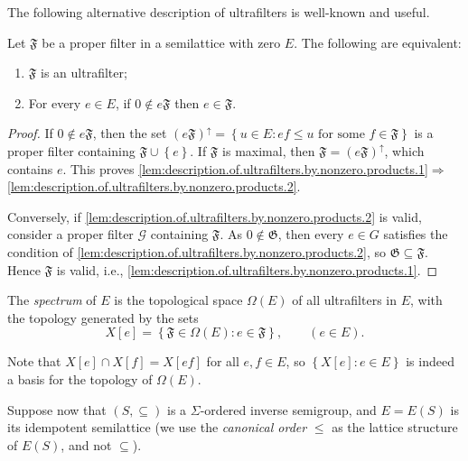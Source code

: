 The following alternative description of ultrafilters is well-known and useful.

\begin{lemma}\label{lem:description.of.ultrafilters.by.nonzero.products}
    Let $\mathfrak{F}$ be a proper filter in a semilattice with zero $E$. The following are equivalent:
    \begin{enumerate}[label=(\arabic*)]
        \item\label{lem:description.of.ultrafilters.by.nonzero.products.1} $\mathfrak{F}$ is an ultrafilter;
        \item\label{lem:description.of.ultrafilters.by.nonzero.products.2} For every $e\in E$, if $0\not\in e\mathfrak{F}$ then $e\in\mathfrak{F}$.
    \end{enumerate}
\end{lemma}
\begin{proof}
    If $0\not\in e\mathfrak{F}$, then the set $(e\mathfrak{F})^{\uparrow}=\left\{u\in E:ef\leq u\text{ for some }f\in\mathfrak{F}\right\}$ is a proper filter containing $\mathfrak{F}\cup\left\{e\right\}$. If $\mathfrak{F}$ is maximal, then $\mathfrak{F}=(e\mathfrak{F})^{\uparrow}$, which contains $e$. This proves \ref{lem:description.of.ultrafilters.by.nonzero.products.1}$\Rightarrow$\ref{lem:description.of.ultrafilters.by.nonzero.products.2}. 
    
    Conversely, if \ref{lem:description.of.ultrafilters.by.nonzero.products.2} is valid, consider a proper filter $\mathcal{G}$ containing $\mathfrak{F}$. As $0\not\in\mathfrak{G}$, then every $e\in G$ satisfies the condition of \ref{lem:description.of.ultrafilters.by.nonzero.products.2}, so $\mathfrak{G}\subseteq\mathfrak{F}$. Hence $\mathfrak{F}$ is valid, i.e., \ref{lem:description.of.ultrafilters.by.nonzero.products.1}.\qedhere
\end{proof}

\begin{definition}
    The \emph{spectrum} of $E$ is the topological space $\Omega(E)$ of all ultrafilters in $E$, with the topology generated by the sets
    \[X[e]=\left\{\mathfrak{F}\in\Omega(E):e\in\mathfrak{F}\right\},\qquad (e\in E).\]
\end{definition}

Note that $X[e]\cap X[f]=X[ef]$ for all $e,f\in E$, so $\left\{X[e]:e\in E\right\}$ is indeed a basis for the topology of $\Omega(E)$.

Suppose now that $(S,\subseteq)$ is a $\Sigma$-ordered inverse semigroup, and $E=E(S)$ is its idempotent semilattice (we use the \emph{canonical order} $\leq$ as the lattice structure of $E(S)$, and not $\subseteq$).

